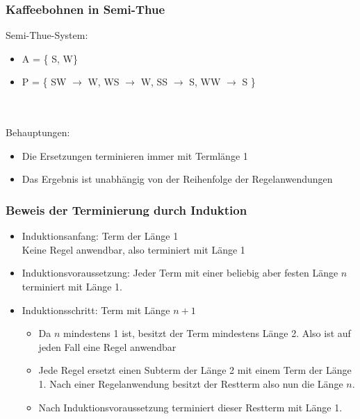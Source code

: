 \begin{frame}
	\frametitle{Kaffeebohnen in Semi-Thue}
	Semi-Thue-System:
	\begin{itemize}
		\item A = \{ S, W\}
		\item P = \{ SW $\rightarrow$ W, WS $\rightarrow$ W, SS $\rightarrow$ S,	WW $\rightarrow$ S \}	
	\end{itemize}~\\~\\
	Behauptungen:
	\begin{itemize}
		\item Die Ersetzungen terminieren immer mit Termlänge 1
		\item Das Ergebnis ist unabhängig von der Reihenfolge der Regelanwendungen
	\end{itemize}
\end{frame}

\begin{frame}
	\frametitle{Beweis der Terminierung durch Induktion}
	\begin{itemize}
		\item Induktionsanfang: Term der Länge 1\\
			Keine Regel anwendbar, also terminiert mit Länge 1
		\item Induktionsvoraussetzung: Jeder Term mit einer beliebig aber festen Länge $n$ terminiert mit Länge 1.
		\item Induktionsschritt: Term mit Länge $n + 1$\\
		\begin{itemize}
			\item Da $n$ mindestens 1 ist, besitzt der Term mindestens Länge 2. Also ist auf jeden Fall eine Regel anwendbar
			\item Jede Regel ersetzt einen Subterm der Länge 2 mit einem Term der Länge 1. Nach einer Regelanwendung besitzt der Restterm also nun die Länge $n$.
			\item Nach Induktionsvoraussetzung terminiert dieser Restterm mit Länge 1.
		\end{itemize}
	\end{itemize}
\end{frame}

